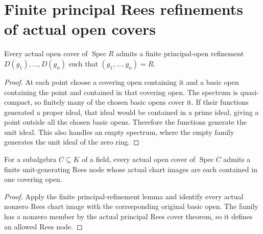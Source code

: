 \section{Finite principal Rees refinements of actual open covers}

\begin{lemma}\label{lem:sc0-finite-principal-open-refinement}
\leanok
Every actual open cover of $\operatorname{Spec}R$ admits a finite principal-open
refinement $D(g_1),\ldots,D(g_n)$ such that $(g_1,\ldots,g_n)=R$.
\end{lemma}
\begin{proof}
At each point choose a covering open containing it and a basic open containing
the point and contained in that covering open. The spectrum is quasi-compact,
so finitely many of the chosen basic opens cover it. If their functions generated
a proper ideal, that ideal would be contained in a prime ideal, giving a point
outside all the chosen basic opens. Therefore the functions generate the unit
ideal. This also handles an empty spectrum, where the empty family generates the
unit ideal of the zero ring.
\end{proof}

\begin{corollary}\label{cor:sc0-finite-principal-rees-refinement}
\leanok
{}
For a subalgebra $C\subseteq K$ of a field, every actual open cover of
$\operatorname{Spec}C$ admits a finite unit-generating Rees node whose actual
chart images are each contained in one covering open.
\end{corollary}
\begin{proof}
Apply the finite principal-refinement lemma and identify every actual nonzero
Rees chart image with the corresponding original basic open. The family has a
nonzero member by the actual principal Rees cover theorem, so it defines an
allowed Rees node.
\end{proof}
